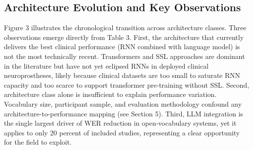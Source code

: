 \subsection{Architecture Evolution and Key Observations}

Figure 3 illustrates the chronological transition across architecture classes. Three observations emerge directly from Table 3. First, the architecture that currently delivers the best clinical performance (RNN combined with language model) is not the most technically recent. Transformers and SSL approaches are dominant in the literature but have not yet eclipsed RNNs in deployed clinical neuroprostheses, likely because clinical datasets are too small to saturate RNN capacity and too scarce to support transformer pre-training without SSL. Second, architecture class alone is insufficient to explain performance variation. Vocabulary size, participant sample, and evaluation methodology confound any architecture-to-performance mapping (see Section 5). Third, LLM integration is the single largest driver of WER reduction in open-vocabulary systems, yet it applies to only 20 percent of included studies, representing a clear opportunity for the field to exploit.

